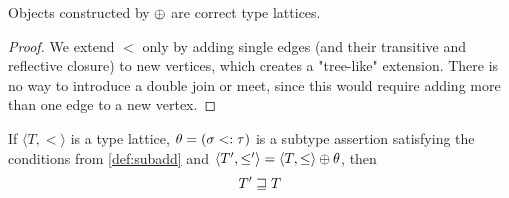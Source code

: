 \documentclass[main.tex]{subfiles}
\begin{document}
\begin{property}
    Objects constructed by $\oplus$ are correct type lattices.
\end{property}
\begin{proof}
    We extend $\less$ only by adding single edges (and their transitive and
    reflective closure) to new vertices, which creates a "tree-like" extension.
    There is no way to introduce a double join or meet, since this would
    require adding more than one edge to a new vertex.
\end{proof}

\begin{lemma}
    \label{lemma:subadd:rel}
    If $\langle T, \less \rangle$ is a type lattice, $\theta = (\sigma <: \tau)$
    is a subtype assertion satisfying the conditions from \cref{def:subadd}
    and $\langle T', \leq' \rangle = \langle T, \leq \rangle \oplus \theta$, then
    \[ T' \sqsupseteq T \]
\end{lemma}
\end{document}
